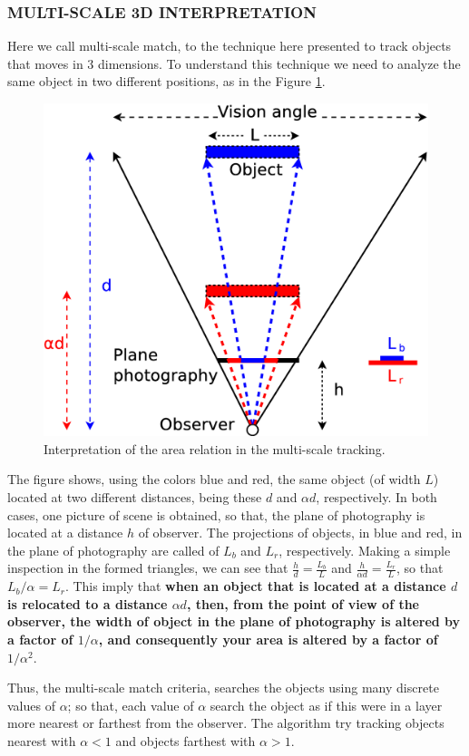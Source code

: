 \subsubsection{MULTI-SCALE 3D INTERPRETATION}
Here we call multi-scale match, to the technique here presented 
to track objects that moves in 3 dimensions. 
To understand this technique we need to analyze the same object in 
two different positions, as in the Figure \ref{fig:multiscale3d}.

\begin{figure}[H]
\centering
  \includegraphics[width=.7\columnwidth]{images/Diagrama3.eps}
  \caption{Interpretation of the area relation in the multi-scale tracking.}
  \label{fig:multiscale3d}
\end{figure}
The figure shows, using the colors blue and red, the same object (of width $L$) located at two 
different distances, being these $d$ and $\alpha d$, respectively. 
In both cases, one picture of scene is obtained,
so that, the plane of photography is located at a distance $h$ of observer.
The projections of objects, in blue and red, in the plane of photography are
called of $L_b$ and $L_r$, respectively. Making a simple inspection in the
formed triangles, we can see that $\frac{h}{d}=\frac{L_b}{L}$ and 
$\frac{h}{\alpha d}=\frac{L_r}{L}$, so that $L_b/\alpha= L_r$. 
This imply that \textbf{when an object that is located
at a distance $d$ is relocated to a distance  $\alpha d$, then,
from the point of view of the observer, the width of object in 
the plane of photography is altered by a factor of $1/\alpha$,
and consequently your area is altered by a factor of $1/\alpha^2$}.

Thus, the multi-scale match criteria, searches the objects
using many discrete values of $\alpha$; so that, each value of $\alpha$
search the object as if this were in a layer more nearest or farthest from the observer.
The algorithm try tracking objects nearest with $\alpha<1$ and objects farthest with $\alpha>1$.

